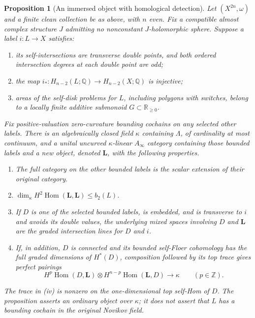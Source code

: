 \documentclass[11pt]{article}
\numberwithin{equation}{section}
\newtheorem{proposition}[theorem]{Proposition}
\theoremstyle{definition}
\theoremstyle{remark}
\begin{document}
\begin{proposition}[An immersed object with homological detection]
 \label{prop:immersed-package}
Let $(X^{2n},\omega)$ and a finite clean collection be as above, with
$n$ even.  Fix a compatible almost complex structure $J$ admitting no
nonconstant $J$-holomorphic sphere.  Suppose a label $i:L\to X$ satisfies:
\begin{enumerate}[label=(\alph*)]
 \item its self-intersections are transverse double points, and both
 ordered intersection degrees at each double point are odd;
 \item the map
 $i_*:H_{n-2}(L;\mathbb Q)\longrightarrow H_{n-2}(X;\mathbb Q)$ is injective;
 \item areas of the self-disk problems for $L$, including polygons with
 switches, belong to a locally finite additive submonoid
 $G\subset\mathbb R_{\geq0}$.
\end{enumerate}
Fix positive-valuation zero-curvature bounding cochains on any selected
other labels.  There is an algebraically closed field $\kappa$ containing
$\Lambda$, of cardinality at most continuum, and a unital uncurved
$\kappa$-linear $A_\infty$ category containing those bounded labels and
a new object, denoted $\mathbf L$, with the following properties.
\begin{enumerate}[label=(\roman*)]
 \item The full category on the other bounded labels is the scalar
 extension of their original category.
 \item $\dim_\kappa H^2\operatorname{Hom}(\mathbf L,\mathbf L)\leq b_2(L)$.
 \item If $D$ is one of the selected bounded labels, is embedded,
 and is transverse to $i$ and avoids its
 double values, the underlying mixed spaces involving $D$ and
 $\mathbf L$ are the graded intersection lines for $D$ and $i$.
 \item If, in addition, $D$ is connected and its bounded self-Floer
 cohomology has the full graded dimensions of $H^*(D)$, composition
 followed by its top trace gives perfect pairings
 \[
 H^p\operatorname{Hom}(D,\mathbf L)\otimes
 H^{n-p}\operatorname{Hom}(\mathbf L,D)\longrightarrow\kappa
 \qquad(p\in\mathbb Z).
 \]
\end{enumerate}
The trace in (iv) is nonzero on the one-dimensional top self-Hom of
$D$.  The proposition asserts an ordinary object over $\kappa$; it does
not assert that $L$ has a bounding cochain in the original Novikov field.
\end{proposition}
\end{document}
